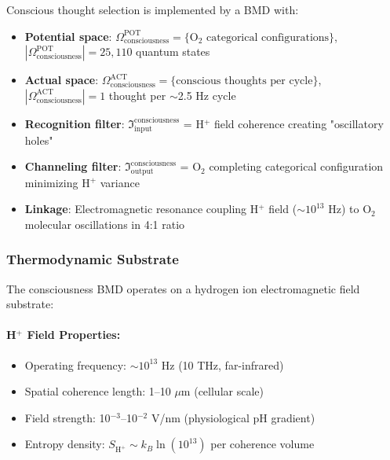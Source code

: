 \begin{definition}
Conscious thought selection is implemented by a BMD with:

\begin{itemize}
\item \textbf{Potential space}: \(\Omega^{\text{POT}}_{\text{consciousness}} = \{\text{O}_2 \text{ categorical configurations}\}\), \(|\Omega^{\text{POT}}_{\text{consciousness}}| = 25{,}110\) quantum states

\item \textbf{Actual space}: \(\Omega^{\text{ACT}}_{\text{consciousness}} = \{\text{conscious thoughts per cycle}\}\), \(|\Omega^{\text{ACT}}_{\text{consciousness}}| = 1\) thought per \(\sim\)2.5 Hz cycle

\item \textbf{Recognition filter}: \(\Im_{\text{input}}^{\text{consciousness}}\) = H\(^+\) field coherence creating "oscillatory holes"

\item \textbf{Channeling filter}: \(\Im_{\text{output}}^{\text{consciousness}}\) = O\(_2\) completing categorical configuration minimizing H\(^+\) variance

\item \textbf{Linkage}: Electromagnetic resonance coupling H\(^+\) field (\(\sim 10^{13}\) Hz) to O\(_2\) molecular oscillations in 4:1 ratio
\end{itemize}
\end{definition}

\subsubsection{Thermodynamic Substrate}

The consciousness BMD operates on a hydrogen ion electromagnetic field substrate:

\paragraph{H\(^+\) Field Properties:}
\begin{itemize}
\item Operating frequency: \(\sim 10^{13}\) Hz (10 THz, far-infrared)
\item Spatial coherence length: 1--10 \(\mu\)m (cellular scale)
\item Field strength: 10\(^{-3}\)--10\(^{-2}\) V/nm (physiological pH gradient)
\item Entropy density: \(S_{\text{H}^+} \sim k_B \ln(10^{13})\) per coherence volume
\end{itemize}

